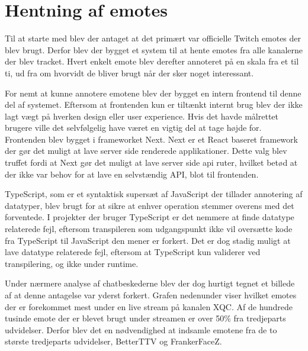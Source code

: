 \documentclass{article}
\begin{document}
\section{Hentning af emotes}
Til at starte med blev der antaget at det primært var officielle Twitch emotes der blev brugt. Derfor blev der bygget et system til at hente emotes fra alle kanalerne der blev tracket. Hvert enkelt emote blev derefter annoteret på en skala fra et til ti, ud fra om hvorvidt de bliver brugt når der sker noget interessant.

For nemt at kunne annotere emotene blev der bygget en intern frontend til denne del af systemet. Eftersom at frontenden kun er tiltænkt internt brug blev der ikke lagt vægt på hverken design eller user experience. Hvis det havde målrettet brugere ville det selvfølgelig have været en vigtig del at tage højde for.
Frontenden blev bygget i frameworket Next. Next er et React baseret framework der gør det muligt at lave server side renderede applikationer. Dette valg blev truffet fordi at Next gør det muligt at lave server side api ruter, hvilket betød at der ikke var behov for at lave en selvstændig API, blot til frontenden.

TypeScript, som er et syntaktisk supersæt af JavaScript der tillader annotering af datatyper, blev brugt for at sikre at enhver operation stemmer overens med det forventede. I projekter der bruger TypeScript er det nemmere at finde datatype relaterede fejl, eftersom transpileren som udgangspunkt ikke vil oversætte kode fra TypeScript til JavaScript den mener er forkert. Det er dog stadig muligt at lave datatype relaterede fejl, eftersom at TypeScript kun validerer ved transpilering, og ikke under runtime.

Under nærmere analyse af chatbeskederne blev der dog hurtigt tegnet et billede af at denne antagelse var yderst forkert. Grafen nedenunder viser hvilket emotes der er forekommet mest under en live stream på kanalen XQC. Af de hundrede tusinde emote der er blevet brugt under streamen er over 50\% fra tredjeparts udvidelser. Derfor blev det en nødvendighed at indsamle emotene fra de to største tredjeparts udvidelser, BetterTTV og FrankerFaceZ.
\end{document}

